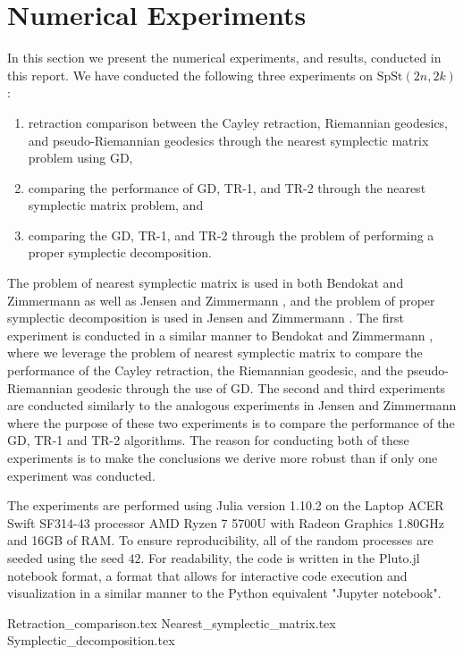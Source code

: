\section{Numerical Experiments}\label{sec:Numerical_experiments}
In this section we present the numerical experiments, and results, conducted in this report. We have conducted the following three experiments on $\mathrm{SpSt}(2n, 2k)$: 
\begin{enumerate}
    \item retraction comparison between the Cayley retraction, Riemannian geodesics, and pseudo-Riemannian geodesics through the nearest symplectic matrix problem using GD, 
    \item comparing the performance of GD, TR-1, and TR-2 through the nearest symplectic matrix problem, and 
    \item comparing the GD, TR-1, and TR-2 through the problem of performing a proper symplectic decomposition.
\end{enumerate}
The problem of nearest symplectic matrix is used in both Bendokat and Zimmermann \cite[p.~25]{BendokatZimmermann2021} as well as Jensen and Zimmermann \cite[p.~15]{JensenZimmermann2024}, and the problem of proper symplectic decomposition is used in Jensen and Zimmermann \cite[p.~17]{JensenZimmermann2024}. The first experiment is conducted in a similar manner to Bendokat and Zimmermann \cite[p.~25]{BendokatZimmermann2021}, where we leverage the problem of nearest symplectic matrix to compare the performance of the Cayley retraction, the Riemannian geodesic, and the pseudo-Riemannian geodesic through the use of GD. The second and third experiments are conducted similarly to the analogous experiments in Jensen and Zimmermann \cite[p.~15~\&~17]{JensenZimmermann2024} where the purpose of these two experiments is to compare the performance of the GD, TR-1 and TR-2 algorithms. The reason for conducting both of these experiments is to make the conclusions we derive more robust than if only one experiment was conducted. 

The experiments are performed using Julia version 1.10.2 on the Laptop ACER Swift SF314-43 processor AMD Ryzen 7 5700U with Radeon Graphics 1.80GHz and 16GB of RAM. To ensure reproducibility, all of the random processes are seeded using the seed $42$. For readability, the code is written in the Pluto.jl notebook format, a format that allows for interactive code execution and visualization in a similar manner to the Python equivalent "Jupyter notebook". 

{Retraction_comparison.tex}
{Nearest_symplectic_matrix.tex}
{Symplectic_decomposition.tex}
